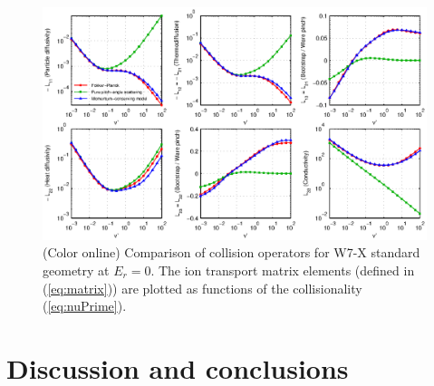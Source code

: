 \documentclass[12pt]{revtex4}
\begin{document}
\begin{figure}[h!]
\includegraphics{m20131208_01_plotSFINCSFortranAndMatlabNuScansForPaper_W7X.eps}
\caption{(Color online) Comparison of collision operators for W7-X standard geometry at $E_r=0$.
The ion transport matrix elements (defined in (\ref{eq:matrix})) are plotted as functions
of the collisionality (\ref{eq:nuPrime}).
\label{fig:collisionComparison_W7X}}
\end{figure}


\section{Discussion and conclusions}
\label{sec:conclusions}
\end{document}
